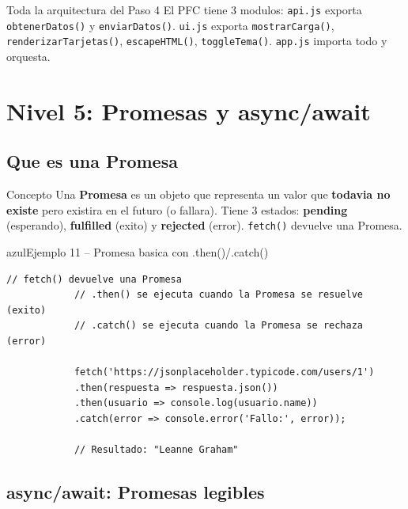\documentclass[11pt,a4paper]{article}
\begin{document}
	\begin{cajapractica}{Toda la arquitectura del Paso 4}
		El PFC tiene 3 modulos: \texttt{api.js} exporta \texttt{obtenerDatos()} y \texttt{enviarDatos()}. \texttt{ui.js} exporta \texttt{mostrarCarga()}, \texttt{renderizarTarjetas()}, \texttt{escapeHTML()}, \texttt{toggleTema()}. \texttt{app.js} importa todo y orquesta.
	\end{cajapractica}
	
	\section{Nivel 5: Promesas y async/await}
	
	\subsection{Que es una Promesa}
	
	\begin{cajaconcepto}{Concepto}
		Una \textbf{Promesa} es un objeto que representa un valor que \textbf{todavia no existe} pero existira en el futuro (o fallara). Tiene 3 estados: \textbf{pending} (esperando), \textbf{fulfilled} (exito) y \textbf{rejected} (error). \texttt{fetch()} devuelve una Promesa.
	\end{cajaconcepto}
	
	\begin{cajacodigo}{azul}{Ejemplo 11 -- Promesa basica con .then()/.catch()}
		\begin{lstlisting}[style=codejs]
			// fetch() devuelve una Promesa
			// .then() se ejecuta cuando la Promesa se resuelve (exito)
			// .catch() se ejecuta cuando la Promesa se rechaza (error)
			
			fetch('https://jsonplaceholder.typicode.com/users/1')
			.then(respuesta => respuesta.json())
			.then(usuario => console.log(usuario.name))
			.catch(error => console.error('Fallo:', error));
			
			// Resultado: "Leanne Graham"
		\end{lstlisting}
	\end{cajacodigo}
	
	\subsection{async/await: Promesas legibles}
	
\end{document}
